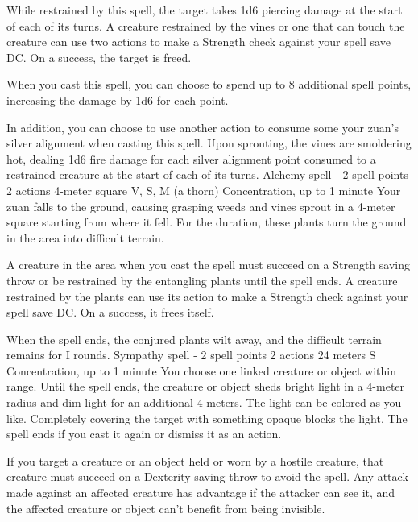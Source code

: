     While restrained by this spell, the target takes 1d6 piercing damage at the start of each of its turns.
    A creature restrained by the vines or one that can touch the creature can use two actions to make a Strength check against your spell save DC.
    On a success, the target is freed.

    When you cast this spell, you can choose to spend up to 8 additional spell points, increasing the damage by 1d6 for each point.

    In addition, you can choose to use another action to consume some your zuan's silver alignment when casting this spell.
    Upon sprouting, the vines are smoldering hot, dealing 1d6 fire damage for each silver alignment point consumed to a restrained creature at the start of each of its turns.
    {Alchemy spell - 2 spell points}
    {2 actions}
    {4-meter square}
    {V, S, M (a thorn)}
    {Concentration, up to 1 minute}
    Your zuan falls to the ground, causing grasping weeds and vines sprout in a 4-meter square starting from where it fell.
    For the duration, these plants turn the ground in the area into difficult terrain.

    A creature in the area when you cast the spell must succeed on a Strength saving throw or be restrained by the entangling plants until the spell ends.
    A creature restrained by the plants can use its action to make a Strength check against your spell save DC.
    On a success, it frees itself.

    When the spell ends, the conjured plants wilt away, and the difficult terrain remains for I rounds.
    {Sympathy spell - 2 spell points}
    {2 actions}
    {24 meters}
    {S}
    {Concentration, up to 1 minute}
    You choose one linked creature or object within range.
    Until the spell ends, the creature or object sheds bright light in a 4-meter radius and dim light for an additional 4 meters.
    The light can be colored as you like.
    Completely covering the target with something opaque blocks the light.
    The spell ends if you cast it again or dismiss it as an action.

    If you target a creature or an object held or worn by a hostile creature, that creature must succeed on a Dexterity saving throw to avoid the spell.
    Any attack made against an affected creature has advantage if the attacker can see it, and the affected creature or object can't benefit from being invisible.

